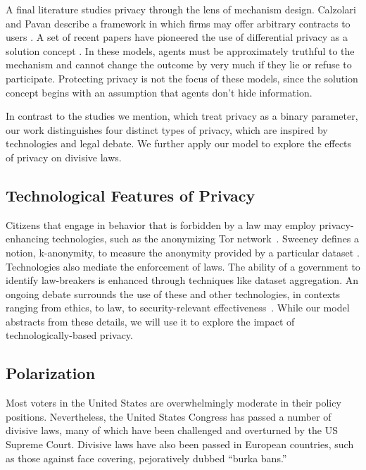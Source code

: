 A final literature studies privacy through the lens of mechanism design.  Calzolari and Pavan describe a framework in which firms may offer arbitrary contracts to users \cite{calzolari2006optimality}.   A set of recent papers have pioneered the use of differential privacy as a solution concept \cite{pai2013privacy}.  In these models, agents must be approximately truthful to the mechanism and cannot change the outcome by very much if they lie or refuse to participate.  Protecting privacy is not the focus of these models, since the solution concept begins with an assumption that agents don't hide information.

In contrast to the studies we mention, which treat privacy as a binary parameter, our work distinguishes four distinct types of privacy, which are inspired by technologies and legal debate.  We further apply our model to explore the effects of privacy on divisive laws.

\subsection{Technological Features of Privacy}

Citizens that engage in behavior that is forbidden by a law may employ privacy-enhancing technologies, such as the anonymizing Tor network~\cite{dingledine2003privacy}.  Sweeney defines a notion, k-anonymity, to measure the anonymity provided by a particular dataset \cite{sweeney2002k}. Technologies also mediate the enforcement of laws.  The ability of a government to identify law-breakers is enhanced through techniques like dataset aggregation\cite{acquisti2009predicting}.  An ongoing debate surrounds the use of these and other technologies, in contexts ranging from ethics\cite{lyon2002surveillance,diffie2010privacy}, to law\cite{landau2009,landau2013making,landau2014,Bankston14}, to security-relevant effectiveness~\cite{schneier2013oppression%
}.  While our model abstracts from these details, we will use it to explore the impact of technologically-based privacy.


\subsection{Polarization}
Most voters in the United States are overwhelmingly moderate in their policy positions\cite{layman2006party}.   Nevertheless, the United States Congress has passed a number of divisive laws, many of which have been challenged and overturned by the US Supreme Court.  Divisive laws have also been passed in European countries, such as those against face covering, pejoratively dubbed ``burka bans.''


